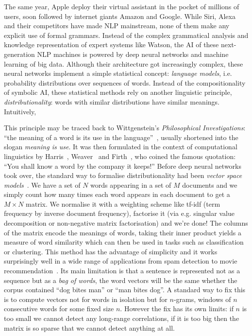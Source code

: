 The same year, Apple deploy their virtual assistant in the pocket of millions of users, soon followed by internet giants Amazon and Google.
While Siri, Alexa and their competitors have made NLP mainstream, none of them make any explicit use of formal grammars.
Instead of the complex grammatical analysis and knowledge representation of expert systems like Watson, the AI of these next-generation NLP machines is powered by deep neural networks and machine learning of big data.
Although their architecture got increasingly complex, these neural networks implement a simple statistical concept: \emph{language models}, i.e. probability distributions over sequences of words.
Instead of the compositionality of symbolic AI, these statistical methods rely on another linguistic principle, \emph{distributionality}: words with similar distributions have similar meanings.
Intuitively,

This principle may be traced back to Wittgenstein's \emph{Philosophical Investigations}: ``the meaning of a word is its use in the language''~\cite{Wittgenstein53}, usually shortened into the slogan \emph{meaning is use}.
It was then formulated in the context of computational linguistics by Harris~\cite{Harris54}, Weaver~\cite{Weaver55} and Firth~\cite{Firth57}, who coined the famous quotation: ``You shall know a word by the company it keeps!''
Before deep neural networks took over, the standard way to formalise distributionality had been \emph{vector space models}~\cite{SaltonEtAl75}.
We have a set of $N$ words appearing in a set of $M$ documents and we simply count how many times each word appears in each document to get a $M \times N$ matrix.
We normalise it with a weighting scheme like tf-idf (term frequency by inverse document frequency), factorise it (via e.g. singular value decomposition or non-negative matrix factorisation) and we're done!
The columns of the matrix encode the meanings of words, taking their inner product yields a measure of word similarity which can then be used in tasks such as classification or clustering.
This method has the advantage of simplicity and it works surprisingly well in a wide range of applications from spam detection to movie recommendation~\cite{TurneyPantel10}.
Its main limitation is that a sentence is represented not as a sequence but as a \emph{bag of words}, the word vectors will be the same whether the corpus contained ``dog bites man'' or ``man bites dog''.
A standard way to fix this is to compute vectors not for words in isolation but for $n$-grams, windows of $n$ consecutive words for some fixed size $n$.
However the fix has its own limits: if $n$ is too small we cannot detect any long-range correlations, if it is too big then the matrix is so sparse that we cannot detect anything at all.


